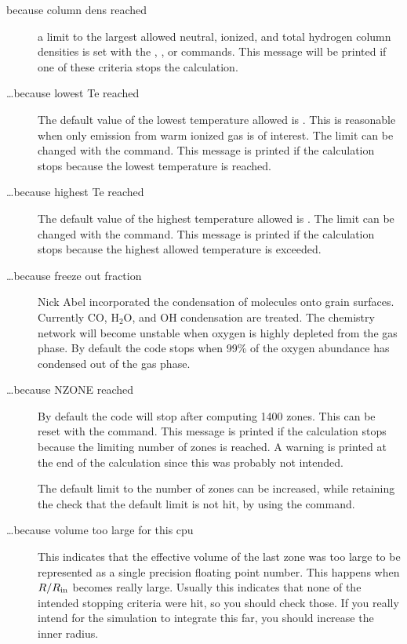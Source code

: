 \begin{description}
\item[ because column dens reached]  a limit to the largest allowed neutral,
ionized, and total hydrogen column densities is set with the , , or 
commands.  This message will be printed if one of these criteria stops the
calculation.

\item[\dots because lowest Te reached]  The default value of the lowest
temperature allowed is \TEMPSTOPDEFAULT.  This is reasonable when only emission from
warm ionized gas is of interest.  The limit can be changed with the
 command.  This message is printed if the calculation stops
because the lowest temperature is reached.

\item[\dots because highest Te reached]  The default value of the highest
temperature allowed is \TEMPLIMITHIGH.  The limit can be changed with the
 command.  This message is printed if the calculation
stops because the highest allowed temperature is exceeded.

\item[\dots because freeze out fraction]  Nick Abel incorporated the
condensation of molecules onto grain surfaces. Currently CO, H$_2$O, and OH
condensation are treated. The chemistry network will become unstable when
oxygen is highly depleted from the gas phase.  By default the code stops
when 99\% of the oxygen abundance has condensed out of the gas phase.

\item[\dots because NZONE reached]  By default the code will stop after computing
1400 zones.  This can be reset with the  command.  This message
is printed if the calculation stops because the limiting number of zones
is reached.  A warning is printed at the end of the calculation since this
was probably not intended.

The default limit to the number of zones can be increased, while retaining
the check that the default limit is not hit, by using the  command.

\item[\dots because volume too large for this cpu] This indicates that the
 effective volume of the last zone was too large to be represented as a single
 precision floating point number. This happens when $R/R_{\rm in}$ becomes
 really large. Usually this indicates that none of the intended stopping
 criteria were hit, so you should check those. If you really intend for the
 simulation to integrate this far, you should increase the inner radius.


\end{description}

